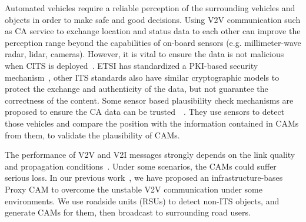 Automated vehicles require a reliable perception of the surrounding vehicles and objects in order to make safe and good decisions.
Using V2V communication such as CA service to exchange location and status data to
each other can improve the perception range beyond the capabilities of on-board sensors (e.g. millimeter-wave radar, lidar, cameras).
However, it is vital to ensure the data is not malicious when CITS is deployed~\cite{amoozadeh2015security}.
ETSI has standardized a PKI-based security mechanism~\cite{etsi2013103},
other ITS standards also have similar cryptographic models to protect the exchange and authenticity of the data,
but not guarantee the correctness of the content.
Some sensor based plausibility check mechanisms are proposed to ensure the CA data can be trusted~\cite{obst2014multi}~\cite{dhurandher2014vehicular}.
They use sensors to detect those vehicles and compare the position with the information contained in CAMs from them, to validate the plausibility of CAMs.

The performance of V2V and V2I messages strongly depends on the link quality and propagation conditions~\cite{shagdar2012experimentation}.
Under some scenarios, the CAMs could suffer serious loss.
In our previous work~\cite{kitazato2016proxy}, we have proposed an infrastructure-bases Proxy CAM to overcome the unstable V2V communication under some environments.
We use roadside units (RSUs) to detect non-ITS objects, and generate CAMs for them, then broadcast to surrounding road users.
